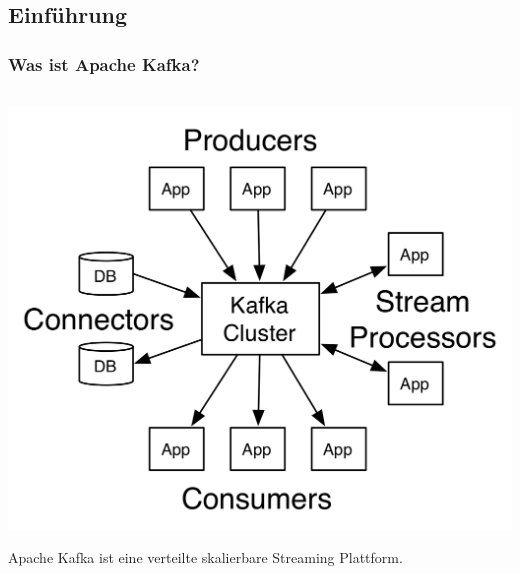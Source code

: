 \subsection{Einführung}
\begin{frame}
\frametitle{Was ist Apache Kafka?}
\begin{columns}[T]
	\begin{column}[T]{0.49\textwidth}
		
	\end{column}
	\begin{column}[T]{0.49\textwidth}
		
\end{column}
\end{columns}
	\centering
	\includegraphics[scale=1.2]{figure/kafka-apis.png}

	Apache Kafka ist eine verteilte skalierbare Streaming Plattform.


\end{frame}

